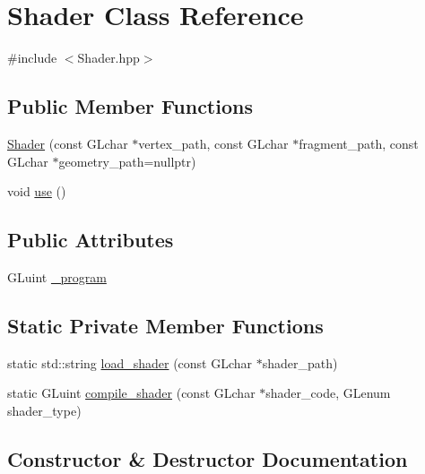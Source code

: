 \hypertarget{classShader}{}\section{Shader Class Reference}
\label{classShader}


{\ttfamily \#include $<$Shader.\+hpp$>$}

\subsection*{Public Member Functions}
\begin{DoxyCompactItemize}
\item 
\hyperlink{classShader_afc35c159fc487d020ccb61887289154e}{Shader} (const G\+Lchar $\ast$vertex\+\_\+path, const G\+Lchar $\ast$fragment\+\_\+path, const G\+Lchar $\ast$geometry\+\_\+path=nullptr)
\item 
void \hyperlink{classShader_a870fa9f13d69e558815d6fd351a469dc}{use} ()
\end{DoxyCompactItemize}
\subsection*{Public Attributes}
\begin{DoxyCompactItemize}
\item 
G\+Luint \hyperlink{classShader_a477aec09e9ee86b96c9843f3715d6a8d}{\+\_\+program}
\end{DoxyCompactItemize}
\subsection*{Static Private Member Functions}
\begin{DoxyCompactItemize}
\item 
static std\+::string \hyperlink{classShader_a7bb9a0b9746d86238c4a31a7b9df5247}{load\+\_\+shader} (const G\+Lchar $\ast$shader\+\_\+path)
\item 
static G\+Luint \hyperlink{classShader_a94e7a84d8fb4e7c0b2dac403b8d752c1}{compile\+\_\+shader} (const G\+Lchar $\ast$shader\+\_\+code, G\+Lenum shader\+\_\+type)
\end{DoxyCompactItemize}


\subsection{Constructor \& Destructor Documentation}
